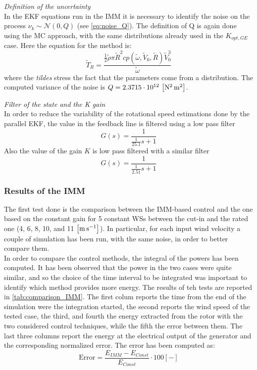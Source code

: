 \textit{Definition of the uncertainty}\\
In the EKF equations run in the IMM it is necessary to identify the noise on the process $\nu_k \sim \mathcal{N}(0, Q)$ (see \autoref{eq:noise_Q}). The definition of Q is again done using the \acrshort{MC} approach, with the same distributions already used in the $K_{opt,GE}$ case. Here the equation for the method is:
\begin{equation}
  \tilde{T}_R=\frac{\frac{1}{2}\tilde{\rho}\pi\tilde{R}^2cp\left(\tilde{\omega}, \tilde{V}_0,\tilde{R}\right)\tilde{V}_0^3}{\tilde{\omega}}
  \label{eq:T_R_distribution}
\end{equation}
where the \textit{tildes} stress the fact that the parameters come from a distribution. The computed variance of the noise is $Q = 2.3715 \cdot 10^{12} \, \left[\si{\square\newton\square\meter}\right]$.

\textit{Filter of the state and the K gain}\\
In order to reduce the variability of the rotational speed estimations done by the parallel \acrshort{EKF}, the value in the feedback line is filtered using a low pass filter
\begin{equation}
  G(s) = \frac{1}{\frac{1}{25.1}s + 1}
\end{equation}
Also the value of the gain $K$ is low pass filtered with a similar filter
\begin{equation}
  G(s) = \frac{1}{\frac{1}{2.51}s + 1}
\end{equation}

\subsubsection{Results of the IMM} 
The first test done is the comparison between the IMM-based control and the one based on the constant gain for 5 constant WSs between the cut-in and the rated one (4, 6, 8, 10, and 11 $\left[\si{\meter\per\second}\right]$). In particular, for each input wind velocity a couple of simulation has been run, with the same noise, in order to better compare them. \\
In order to compare the control methods, the integral of the powers has been computed. It has been observed that the power in the two cases were quite similar, and so the choice of the time interval to be integrated was important to identify which method provides more energy. The results of teh tests are reported in \autoref{tab:comparison_IMM}. The first colum reports the time from the end of the simulation were the integration started, the second reports the wind speed of the tested case, the third, and fourth the energy extracted from the rotor with the two considered control techniques, while the fifth the error between them. The last three columns report the energy at the electrical output of the generator and the corresponding normalized error. The error has been computed as:
\begin{equation}
  \text{Error} = \frac{E_{IMM}-E_{Const}}{E_{Const}}\cdot 100 \left[-\right]
  \label{eq:energy_error}
\end{equation}

